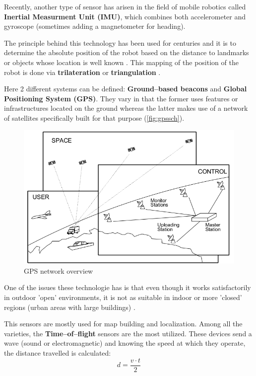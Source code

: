 Recently, another type of sensor has arisen in the field of mobile robotics called \textbf{Inertial Measurment Unit (IMU)}, which combines both accelerometer and gyroscope (sometimes adding a magnetometer for heading).

 The principle behind this technology has been used for centuries and it is to determine the absolute position of the robot based on the distance to landmarks or objects whose location is well known . This mapping of the position of the robot is done via \textbf{trilateration} or \textbf{triangulation} .

Here 2 different systems can be defined: \textbf{Ground--based beacons} and \textbf{Global Positioning System (GPS)}. They vary in that the former uses features or infrastructures located on the ground whereas the latter makes use of a network of satellites specifically built for that purpose (\autoref{fig:gpssch}). 

\begin{figure}[htb]
  \centering
  \includegraphics[width=\linewidth]{pictures/02/gps}
  \caption{GPS network overview}
  \label{fig:gpssch}
\end{figure} 

One of the issues these technologie has is that even though it works satisfactorily in outdoor 'open' environments, it is not as suitable in indoor or more 'closed' regions (urban areas with large buildings) . 

 This sensors are mostly used for map building and localization. Among all the varieties, the \textbf{Time--of--flight} sensors are the most utilized. These devices send a wave (sound or electromagnetic) and knowing the speed at which they operate, the distance travelled is calculated:
\begin{equation}
  d = \frac{v\cdot t}{2}
  \label{eq:tof}
\end{equation} 

